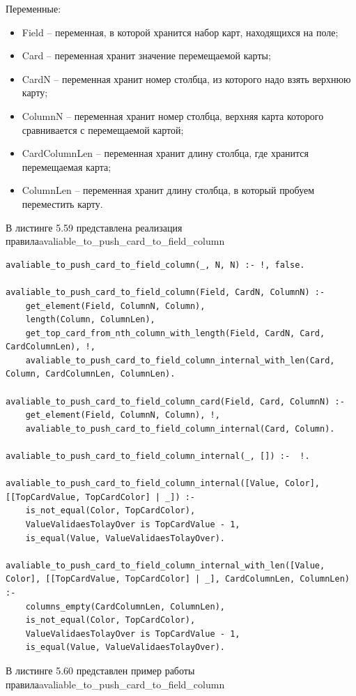 \documentclass[12pt]{report}
\begin{document}
Переменные:
\begin{itemize}
\item Field – переменная, в которой хранится набор карт, находящихся на поле;
\item Card – переменная хранит значение перемещаемой карты;
\item CardN – переменная хранит номер столбца, из которого надо взять верхнюю карту;
\item ColumnN – переменная хранит номер столбца, верхняя карта которого сравнивается с перемещаемой картой;
\item CardColumnLen – переменная хранит длину столбца, где хранится перемещаемая карта;
\item ColumnLen – переменная хранит длину столбца, в который пробуем переместить карту.
\end{itemize}

В листинге 5.59 представлена реализация правила\newline avaliable\_to\_push\_card\_to\_field\_column

\begin{lstlisting}[label=some-code, caption=реализация правила avaliable\_to\_push\_card\_to\_field\_column]
avaliable_to_push_card_to_field_column(_, N, N) :- !, false.

avaliable_to_push_card_to_field_column(Field, CardN, ColumnN) :-
	get_element(Field, ColumnN, Column),
	length(Column, ColumnLen),
	get_top_card_from_nth_column_with_length(Field, CardN, Card, CardColumnLen), !,
	avaliable_to_push_card_to_field_column_internal_with_len(Card, Column, CardColumnLen, ColumnLen).

avaliable_to_push_card_to_field_column_card(Field, Card, ColumnN) :-
	get_element(Field, ColumnN, Column), !,
	avaliable_to_push_card_to_field_column_internal(Card, Column).

avaliable_to_push_card_to_field_column_internal(_, []) :-  !.

avaliable_to_push_card_to_field_column_internal([Value, Color], [[TopCardValue, TopCardColor] | _]) :-
	is_not_equal(Color, TopCardColor),
	ValueValidaesTolayOver is TopCardValue - 1,
	is_equal(Value, ValueValidaesTolayOver).

avaliable_to_push_card_to_field_column_internal_with_len([Value, Color], [[TopCardValue, TopCardColor] | _], CardColumnLen, ColumnLen) :-
	columns_empty(CardColumnLen, ColumnLen),
	is_not_equal(Color, TopCardColor),
	ValueValidaesTolayOver is TopCardValue - 1,
	is_equal(Value, ValueValidaesTolayOver).
\end{lstlisting}
В листинге 5.60 представлен пример работы правила\newline avaliable\_to\_push\_card\_to\_field\_column
\end{document}
